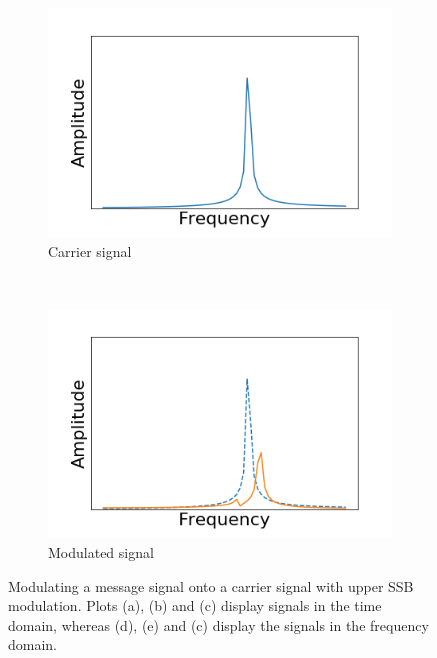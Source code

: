 \documentclass[]{article}
\begin{document}
\begin{figure}[h!]
	\begin{subfigure}[b]{0.3\textwidth}
		\includegraphics[width=\textwidth]{figs/amplitude_modulation/ssb/carrier_signal_freq.png}
		\caption{Carrier signal}
		\label{fig:ssb_carrier_signal_freq}
	\end{subfigure}
	~ %
	\begin{subfigure}[b]{0.3\textwidth}
		\includegraphics[width=\textwidth]{figs/amplitude_modulation/ssb/modulated_signal_freq.png}
		\caption{Modulated signal}
		\label{fig:ssb_modulated_signal_freq}
	\end{subfigure}
	\caption{Modulating a message signal onto a carrier signal with upper SSB modulation. Plots (a), (b) and (c) display signals in the time domain, whereas (d), (e) and (c) display the signals in the frequency domain.}\label{fig:ssb_modulation}
\end{figure}
\end{document}
